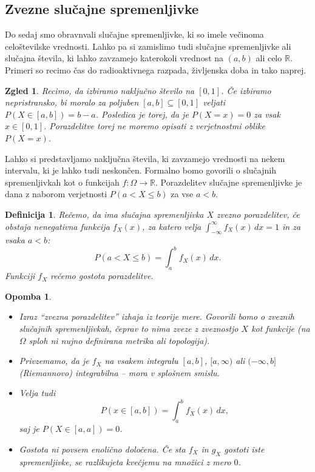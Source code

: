 \documentclass[10pt, a4paper]{article}
\newtheorem{defi}[izr]{Definicija}
\newenvironment{noticeB}{%
  \tcolorbox[%
  notitle,
  empty,
  enhanced,  %
  breakable,
  coltext=black,
  colback=white, 
  fontupper=\rmfamily,
  noparskip,
  sharp corners,
  boxrule=-1pt,  %
  frame hidden,
  left=7pt,  %
  right=7pt,
  top=5pt,
  bottom=5pt,
  before skip=2.5ex plus 2pt,
  after skip=2.5ex plus 2pt,
  borderline west = {1.5pt}{-0.1pt}{blue!30!black}, %
  overlay unbroken and last={%
    \draw[color=black, line width=1.25pt]
    ($(frame.south west)+(1.pt, -0.1pt)$) -- ++(2em, 0);
  }
  ]}
{\endtcolorbox}
\newenvironment{definicija}{\begin{noticeB}\begin{defi}}{%
    \end{defi}\end{noticeB}}
\newtheorem*{opomba}{Opomba}
\newtheorem{zgled}[izr]{Zgled}
\newcommand{\R}{\mathbb {R}}
\begin{document}
\subsection{Zvezne slučajne spremenljivke}

Do sedaj smo obravnvali slučajne spremenljivke, ki so imele večinoma 
celoštevilske vrednosti. Lahko pa si zamislimo tudi 
slučajne spremenljivke ali slučajna števila, ki lahko zavzamejo katerokoli vrednost 
na $(a, b)$ ali celo $\R$.
Primeri so recimo čas do radioaktivnega razpada, življenska doba in tako naprej.

\begin{zgled}
  Recimo, da izbiramo naključno število na $[0, 1]$.
  Če izbiramo nepristransko, bi moralo za poljuben $[a, b] \subseteq [0, 1]$ veljati
  $P(X \in [a, b]) = b - a$. 
  Posledica je torej, da je $P(X = x) = 0$
  za vsak $x \in [0, 1]$.
  Porazdelitve torej ne moremo opisati z verjetnostmi 
  oblike $P(X = x)$.  
\end{zgled}

Lahko si predstavljamo naključna števila, ki zavzamejo vrednosti na 
nekem intervalu, ki je lahko tudi neskončen.
Formalno bomo govorili o slučajnih spremenljivkah kot o funkcijah 
$f: \Omega \to \R$. Porazdelitev slučajne spremenljivke je dana z naborom verjetnosti 
$P(a < X \leq b)$ za vse $a < b$.

\begin{definicija}
  Rečemo, da ima slučajna spremenljivka $X$ zvezno porazdelitev,
  če obstaja nenegativna funkcija $f_X (x)$, za katero velja $\int_{-\infty} ^\infty f_X(x)\, dx = 1$
  in za vsaka $a < b$:
  $$P(a < X \leq b) = \int_a ^b f_X (x)\, dx.$$
  Funkciji $f_X$ rečemo gostota porazdelitve.
\end{definicija}

\begin{opomba}
  \begin{itemize}
    \item Izraz "`zvezna porazdelitev"' izhaja iz teorije mere.
    Govorili bomo o zveznih slučajnih spremenljivkah, čeprav to nima zveze z 
    zveznostjo $X$ kot funkcije (na $\Omega$ sploh ni nujno definirana metrika ali topologija).
    \item Privzemamo, da je $f_X$ na vsakem integralu $[a, b]$, $[a, \infty)$ ali $(-\infty, b]$
    (Riemannovo) integrabilna -- mora v splošnem smislu.
    \item Velja tudi $$P(x \in [a, b]) = \int_a ^b f_X (x)\, dx,$$
    saj je $P(X \in [a, a]) = 0$.
    \item Gostota ni povsem enolično določena. Če sta $f_X$ in $g_X$
    gostoti iste spremenljivke, se razlikujeta kvečjemu na množici z mero $0$.
  \end{itemize}
\end{opomba}
\end{document}
